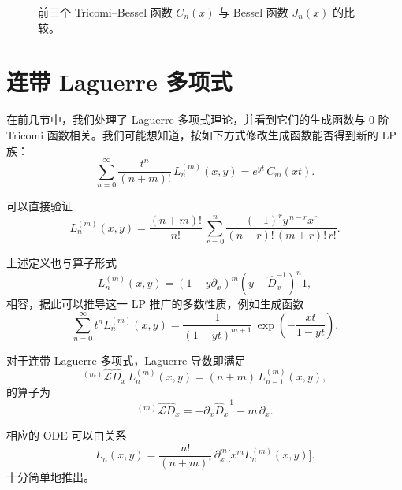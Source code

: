 \begin{figure}[h]
\centering
\setlength{\fboxsep}{6pt}
\caption{前三个 Tricomi--Bessel 函数 $C_n(x)$ 与 Bessel 函数 $J_n(x)$ 的比较。}
\label{fig:4.5}
\end{figure}

\section{连带 Laguerre 多项式}

在前几节中，我们处理了 Laguerre 多项式理论，并看到它们的生成函数与 0 阶 Tricomi 函数相关。我们可能想知道，按如下方式修改生成函数能否得到新的 LP 族：
\begin{equation}
\sum_{n=0}^{\infty} \frac{t^n}{(n+m)!}\,L_n^{(m)}(x,y)
= e^{yt}\,C_m(xt).
\label{eq:4.5.1}
\end{equation}

可以直接验证
\begin{equation}
L_n^{(m)}(x,y)
= \frac{(n+m)!}{n!}\,
\sum_{r=0}^{n} \frac{(-1)^r y^{\,n-r} x^r}{(n-r)!\,(m+r)!\,r!}.
\label{eq:4.5.2}
\end{equation}

上述定义也与算子形式
\begin{equation}
L_n^{(m)}(x,y)
= (1 - y\partial_x)^m (y - \hat D_x^{-1})^n 1,
\label{eq:4.5.3}
\end{equation}
相容，据此可以推导这一 LP 推广的多数性质，例如生成函数
\begin{equation}
\sum_{n=0}^{\infty} t^n L_n^{(m)}(x,y)
= \frac{1}{(1-yt)^{m+1}}\,\exp\!\left(-\frac{xt}{1-yt}\right).
\label{eq:4.5.4}
\end{equation}

对于连带 Laguerre 多项式，Laguerre 导数即满足
\begin{equation}
{}^{(m)}\!\hat{\mathcal L}\!\hat D_x\,
L_n^{(m)}(x,y) = (n+m)\,L_{n-1}^{(m)}(x,y),
\label{eq:4.5.5}
\end{equation}
的算子为
\begin{equation}
{}^{(m)}\!\hat{\mathcal L}\!\hat D_x
= -\partial_x \hat D_x^{-1} - m\,\partial_x.
\label{eq:4.5.6}
\end{equation}

相应的 ODE 可以由关系
\begin{equation}
L_n(x,y) = \frac{n!}{(n+m)!}\,\partial_x^m
\bigl[x^m L_n^{(m)}(x,y)\bigr].
\label{eq:4.5.7}
\end{equation}
十分简单地推出。


